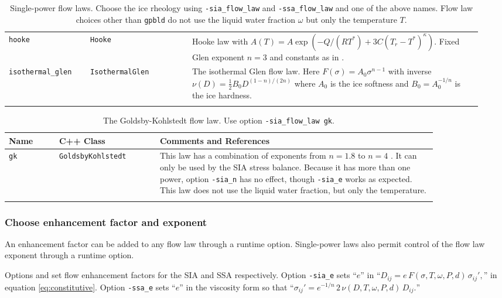 \begin{table}[ht]
\begin{tabular}{p{0.16\linewidth}p{0.2\linewidth}p{0.58\linewidth}}
\texttt{hooke} & \texttt{Hooke} & Hooke law with \mbox{$A(T) = A \exp(-Q/(RT^*) + 3C (T_r - T^*)^\kappa)$.}  Fixed Glen exponent $n=3$ and constants as in \cite{Hooke,PayneBaldwin}.\\
\texttt{isothermal_glen} &  \texttt{IsothermalGlen} & The isothermal Glen flow law.  Here $F(\sigma) = A_0 \sigma^{n-1}$ with inverse $\nu(D) = \frac{1}{2} B_0 D^{(1-n)/(2n)}$ where $A_0$ is the ice softness and $B_0=A_0^{-1/n}$ is the ice hardness. \\
\bottomrule
\normalsize	
\end{tabular}
\caption{Single-power flow laws.  Choose the ice rheology using \texttt{-sia_flow_law} and \texttt{-ssa_flow_law} and one of the above names.  Flow law choices other than \texttt{gpbld} do not use the liquid water fraction $\omega$ but only the temperature $T$.}
\label{tab:flowlaw}
\end{table}

\begin{table}[ht]
\centering
{}
\small
\begin{tabular}{p{0.1\linewidth}p{0.2\linewidth}p{0.55\linewidth}}\toprule
\textbf{Name} & C++ Class & \textbf{Comments and References} \\ \midrule
\texttt{gk} & \texttt{GoldsbyKohlstedt} & This law has a combination of exponents from $n=1.8$ to $n=4$ \cite{GoldsbyKohlstedt}.  It can only be used by the SIA stress balance.  Because it has more than one power, option \texttt{-sia_n} has no effect, though \texttt{-sia_e} works as expected.  This law does not use the liquid water fraction, but only the temperature. \\
\bottomrule
\normalsize	
\end{tabular}
\caption{The Goldsby-Kohlstedt flow law. Use option \texttt{-sia_flow_law gk}.}
\label{tab:flowlawgk}
\end{table}


\subsubsection*{Choose enhancement factor and exponent}  An enhancement factor can be added to any flow law through a runtime option.  Single-power laws also permit control of the flow law exponent through a runtime option.

Options  and  set flow enhancement factors for the SIA and SSA respectively.  Option \texttt{-sia_e} sets ``$e$'' in ``$D_{ij} = e\, F(\sigma,T,\omega,P,d)\, \sigma_{ij}',$'' in equation \eqref{eq:constitutive}.  Option \texttt{-ssa_e} sets ``$e$'' in the viscosity form so that ``$\sigma_{ij}'  = e^{-1/n}\, 2\, \nu(D,T,\omega,P,d)\, D_{ij}.$''

